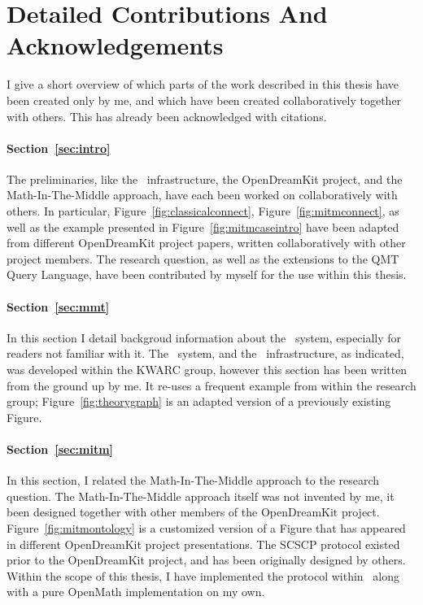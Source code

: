 \appendix
\section{Detailed Contributions And Acknowledgements}\label{sec:contrib}

I give a short overview of which parts of the work described in this thesis have been created only by me, and which have been created collaboratively together with others. 
This has already been acknowledged with citations. 

\paragraph*{Section~\ref{sec:intro}}
The preliminaries, like the \omdocmmt\ infrastructure, the OpenDreamKit project, and the Math-In-The-Middle approach, have each been worked on collaboratively with others. 
In particular, Figure~\ref{fig:classicalconnect}, Figure~\ref{fig:mitmconnect}, as well as the example presented in Figure~\ref{fig:mitmcaseintro} have been adapted from different OpenDreamKit project papers, written collaboratively with other project members. 
The research question, as well as the extensions to the QMT Query Language, have been contributed by myself for the use within this thesis. 

\paragraph*{Section~\ref{sec:mmt}}
In this section I detail backgroud information about the \mmt\ system, especially for readers not familiar with it. 
The \mmt\ system, and the \omdocmmt\ infrastructure, as indicated, was developed within the KWARC group, however this section has been written from the ground up by me. 
It re-uses a frequent example from within the research group; Figure~\ref{fig:theorygraph} is an adapted version of a previously existing Figure. 

\paragraph*{Section~\ref{sec:mitm}}
In this section, I related the Math-In-The-Middle approach to the research question. 
The Math-In-The-Middle approach itself was not invented by me, it been designed together with other members of the OpenDreamKit project. 
Figure~\ref{fig:mitmontology} is a customized version of a Figure that has appeared in different OpenDreamKit project presentations. 
The SCSCP protocol existed prior to the OpenDreamKit project, and has been originally designed by others. 
Within the scope of this thesis, I have implemented the protocol within \mmt\ along with a pure OpenMath implementation on my own.  

